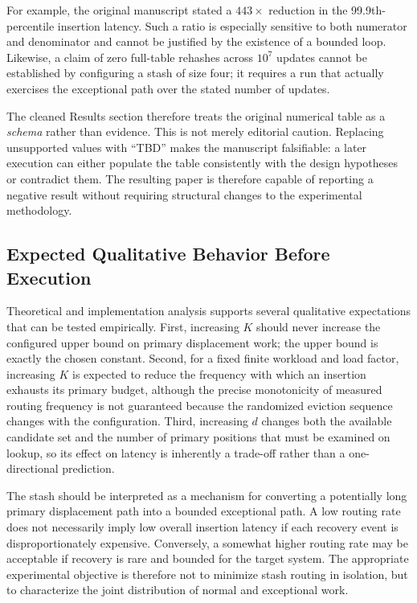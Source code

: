 \documentclass[conference]{IEEEtran}
\begin{document}
For example, the original manuscript stated a $443\times$ reduction in the 99.9th-percentile insertion latency. Such a ratio is especially sensitive to both numerator and denominator and cannot be justified by the existence of a bounded loop. Likewise, a claim of zero full-table rehashes across $10^7$ updates cannot be established by configuring a stash of size four; it requires a run that actually exercises the exceptional path over the stated number of updates.

The cleaned Results section therefore treats the original numerical table as a \emph{schema} rather than evidence. This is not merely editorial caution. Replacing unsupported values with ``TBD'' makes the manuscript falsifiable: a later execution can either populate the table consistently with the design hypotheses or contradict them. The resulting paper is therefore capable of reporting a negative result without requiring structural changes to the experimental methodology.

\subsection{Expected Qualitative Behavior Before Execution}
\label{subsec:qualitative_expectations}

Theoretical and implementation analysis supports several qualitative expectations that can be tested empirically. First, increasing $K$ should never increase the configured upper bound on primary displacement work; the upper bound is exactly the chosen constant. Second, for a fixed finite workload and load factor, increasing $K$ is expected to reduce the frequency with which an insertion exhausts its primary budget, although the precise monotonicity of measured routing frequency is not guaranteed because the randomized eviction sequence changes with the configuration. Third, increasing $d$ changes both the available candidate set and the number of primary positions that must be examined on lookup, so its effect on latency is inherently a trade-off rather than a one-directional prediction.

The stash should be interpreted as a mechanism for converting a potentially long primary displacement path into a bounded exceptional path. A low routing rate does not necessarily imply low overall insertion latency if each recovery event is disproportionately expensive. Conversely, a somewhat higher routing rate may be acceptable if recovery is rare and bounded for the target system. The appropriate experimental objective is therefore not to minimize stash routing in isolation, but to characterize the joint distribution of normal and exceptional work.
\end{document}
